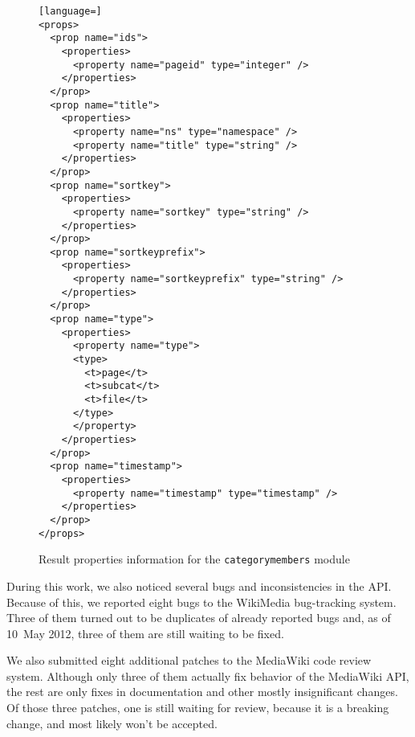 \begin{figure}[p]

\begin{lstlisting}[language=]
<props>
  <prop name="ids">
    <properties>
      <property name="pageid" type="integer" />
    </properties>
  </prop>
  <prop name="title">
    <properties>
      <property name="ns" type="namespace" />
      <property name="title" type="string" />
    </properties>
  </prop>
  <prop name="sortkey">
    <properties>
      <property name="sortkey" type="string" />
    </properties>
  </prop>
  <prop name="sortkeyprefix">
    <properties>
      <property name="sortkeyprefix" type="string" />
    </properties>
  </prop>
  <prop name="type">
    <properties>
      <property name="type">
      <type>
        <t>page</t>
        <t>subcat</t>
        <t>file</t>
      </type>
      </property>
    </properties>
  </prop>
  <prop name="timestamp">
    <properties>
      <property name="timestamp" type="timestamp" />
    </properties>
  </prop>
</props>
\end{lstlisting}

\caption{Result properties information for the \texttt{categorymembers} module}
\label{paraminfo props}
\end{figure}

During this work, we also noticed several bugs and inconsistencies in the API.
Because of this, we reported eight bugs to the WikiMedia bug-tracking system.
Three of them turned out to be duplicates of already reported bugs and,
as of 10~May 2012, three of them are still waiting to be fixed.

We also submitted eight additional patches to the MediaWiki code review system.
Although only three of them actually fix behavior of the MediaWiki API,
the rest are only fixes in documentation and other mostly insignificant changes.
Of those three patches, one is still waiting for review, because it is a breaking change,
and most likely won't be accepted.